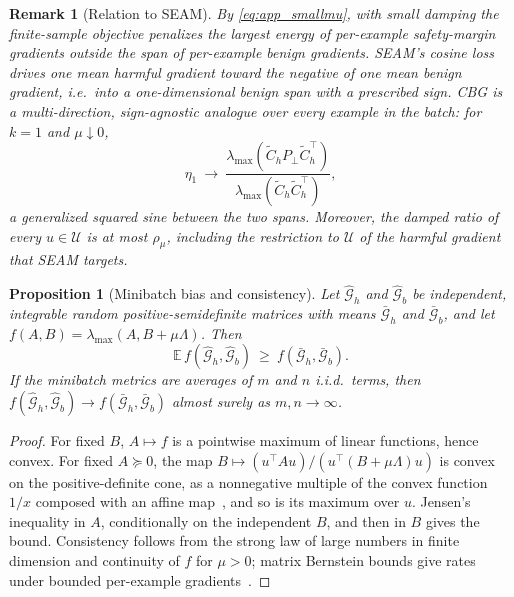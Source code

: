 \documentclass[11pt]{article}
\newtheorem{proposition}{Proposition}
\newtheorem{remark}{Remark}
\newcommand{\Ghh}{\widehat{\mathcal{G}}_{h}}
\newcommand{\Gbh}{\widehat{\mathcal{G}}_{b}}
\newcommand{\U}{\mathcal{U}}
\newcommand{\rhoreg}{\rho_{\mu}}
\begin{document}
\begin{remark}[Relation to SEAM]
\label{rem:seam}
By \cref{eq:app_smallmu}, with small damping the finite-sample objective penalizes the largest energy of per-example safety-margin gradients outside the span of per-example benign gradients. SEAM's cosine loss~\citep{wang2026seam} drives one mean harmful gradient toward the negative of one mean benign gradient, i.e.\ into a one-dimensional benign span with a prescribed sign. CBG is a multi-direction, sign-agnostic analogue over every example in the batch: for $k=1$ and $\mu\downarrow0$,
\begin{equation*}
\eta_1\ \to\ \frac{\lambda_{\max}(\widetilde C_hP_\perp\widetilde C_h^\top)}{\lambda_{\max}(\widetilde C_h\widetilde C_h^\top)},
\end{equation*}
a generalized squared sine between the two spans. Moreover, the damped ratio of every $u\in\U$ is at most $\rhoreg$, including the restriction to $\U$ of the harmful gradient that SEAM targets.
\end{remark}

\begin{proposition}[Minibatch bias and consistency]
\label{prop:jensen}
Let $\Ghh$ and $\Gbh$ be independent, integrable random positive-semidefinite matrices with means $\bar{\mathcal G}_h$ and $\bar{\mathcal G}_b$, and let $f(A,B)=\lambda_{\max}(A,B+\mu\Lambda)$. Then
\begin{equation*}
\mathbb E\,f(\Ghh,\Gbh)\ \ge\ f(\bar{\mathcal G}_h,\bar{\mathcal G}_b).
\end{equation*}
If the minibatch metrics are averages of $m$ and $n$ i.i.d.\ terms, then $f(\Ghh,\Gbh)\to f(\bar{\mathcal G}_h,\bar{\mathcal G}_b)$ almost surely as $m,n\to\infty$.
\end{proposition}
\begin{proof}
For fixed $B$, $A\mapsto f$ is a pointwise maximum of linear functions, hence convex. For fixed $A\succeq0$, the map $B\mapsto(u^\top Au)/(u^\top(B+\mu\Lambda)u)$ is convex on the positive-definite cone, as a nonnegative multiple of the convex function $1/x$ composed with an affine map~\citep{boyd2004convex}, and so is its maximum over $u$. Jensen's inequality in $A$, conditionally on the independent $B$, and then in $B$ gives the bound. Consistency follows from the strong law of large numbers in finite dimension and continuity of $f$ for $\mu>0$; matrix Bernstein bounds give rates under bounded per-example gradients~\citep{tropp2012user}.
\end{proof}
\end{document}
